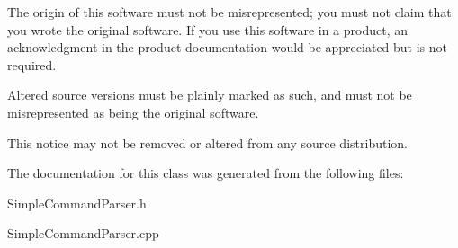 \begin{DoxyEnumerate}
\item The origin of this software must not be misrepresented; you must not claim that you wrote the original software. If you use this software in a product, an acknowledgment in the product documentation would be appreciated but is not required.
\item Altered source versions must be plainly marked as such, and must not be misrepresented as being the original software.
\item This notice may not be removed or altered from any source distribution. 
\end{DoxyEnumerate}

The documentation for this class was generated from the following files\+:\begin{DoxyCompactItemize}
\item 
Simple\+Command\+Parser.\+h\item 
Simple\+Command\+Parser.\+cpp\end{DoxyCompactItemize}
